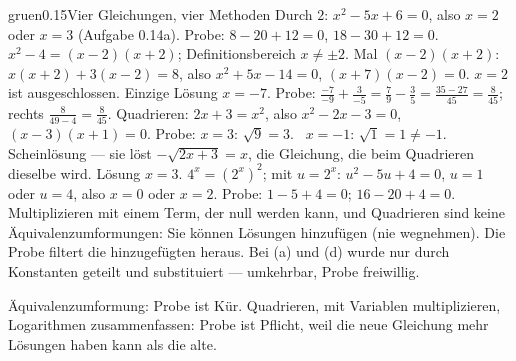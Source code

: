 \begin{loesungkarte}{gruen}{0.15}{Vier Gleichungen, vier Methoden}
Durch $2$: $x^{2} - 5x + 6 = 0$, also $x = 2$ oder $x = 3$ (Aufgabe 0.14a). Probe: $8 - 20 + 12 = 0$, $18 - 30 + 12 = 0$. \checkmark
{}
$x^{2} - 4 = (x - 2)(x + 2)$; Definitionsbereich $x\neq\pm2$. Mal $(x - 2)(x + 2)$: $x(x + 2) + 3(x - 2) = 8$, also $x^{2} + 5x - 14 = 0$, $(x + 7)(x - 2) = 0$. $x = 2$ ist ausgeschlossen. Einzige Lösung $x = -7$. Probe: $\frac{-7}{-9} + \frac3{-5} = \frac79 - \frac35 = \frac{35 - 27}{45} = \frac8{45}$; rechts $\frac8{49 - 4} = \frac8{45}$. \checkmark
{}
Quadrieren: $2x + 3 = x^{2}$, also $x^{2} - 2x - 3 = 0$, $(x - 3)(x + 1) = 0$. Probe: $x = 3$: $\sqrt9 = 3$. \checkmark\ $x = -1$: $\sqrt1 = 1\neq-1$. Scheinlösung --- sie löst $-\sqrt{2x + 3} = x$, die Gleichung, die beim Quadrieren dieselbe wird. Lösung $x = 3$.
$4^{x} = (2^{x})^{2}$; mit $u = 2^{x}$: $u^{2} - 5u + 4 = 0$, $u = 1$ oder $u = 4$, also $x = 0$ oder $x = 2$. Probe: $1 - 5 + 4 = 0$; $16 - 20 + 4 = 0$. \checkmark
{}
Multiplizieren mit einem Term, der null werden kann, und Quadrieren sind keine Äquivalenzumformungen: Sie können Lösungen hinzufügen (nie wegnehmen). Die Probe filtert die hinzugefügten heraus. Bei (a) und (d) wurde nur durch Konstanten geteilt und substituiert --- umkehrbar, Probe freiwillig.
\begin{mitnehmen}\kastentext
Äquivalenzumformung: Probe ist Kür. Quadrieren, mit Variablen multiplizieren, Logarithmen zusammenfassen: Probe ist Pflicht, weil die neue Gleichung mehr Lösungen haben kann als die alte.
\end{mitnehmen}
\end{loesungkarte}

